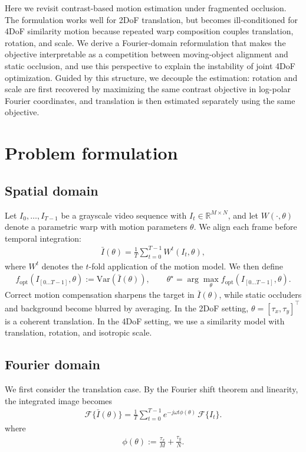 \documentclass{article}
\begin{document}
Here we revisit contrast-based motion estimation under fragmented occlusion. The formulation works well for 2DoF translation, but becomes ill-conditioned for 4DoF similarity motion because repeated warp composition couples translation, rotation, and scale. We derive a Fourier-domain reformulation that makes the objective interpretable as a competition between moving-object alignment and static occlusion, and use this perspective to explain the instability of joint 4DoF optimization. Guided by this structure, we decouple the estimation: rotation and scale are first recovered by maximizing the same contrast objective in log-polar Fourier coordinates, and translation is then estimated separately using the same objective.

\section{Problem formulation}
\subsection{Spatial domain}
Let $I_0,\dots,I_{T-1}$ be a grayscale video sequence with $I_t \in \mathbb{R}^{M\times N}$, and let $W(\cdot,\theta)$ denote a parametric warp with motion parameters $\theta$. We align each frame before temporal integration:
\begin{align}
\bar{I}(\theta)=\frac{1}{T}\sum_{t=0}^{T-1} W^t(I_t,\theta),
\label{eq:int_img}
\end{align}
where $W^t$ denotes the $t$-fold application of the motion model. We then define
\begin{align}
f_{\mathrm{opt}}(I_{[0\dots T-1]},\theta)
:=
\mathrm{Var}\!\left(\bar{I}(\theta)\right),
\qquad
\theta^\star=\arg\max_\theta f_{\mathrm{opt}}(I_{[0\dots T-1]},\theta).
\label{eq:fopt_spatial}
\end{align}
Correct motion compensation sharpens the target in $\bar{I}(\theta)$, while static occluders and background become blurred by averaging. In the 2DoF setting, $\theta=[\tau_x,\tau_y]^\top$ is a coherent translation. In the 4DoF setting, we use a similarity model with translation, rotation, and isotropic scale.

\subsection{Fourier domain}
We first consider the translation case. By the Fourier shift theorem and linearity, the integrated image becomes
\begin{align}
\mathcal{F}\{\bar{I}(\theta)\}
=
\frac{1}{T}\sum_{t=0}^{T-1} e^{-j\omega t \phi(\theta)} \,\mathcal{F}\{I_t\}.
\label{eq:ft_int_compact}
\end{align}
where
\begin{align}
\phi(\theta):=\frac{\tau_x}{M}+\frac{\tau_y}{N}.
\end{align}
\end{document}
